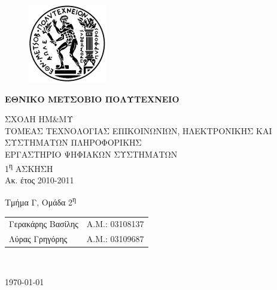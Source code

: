 \begin{titlepage}
\begin{center}
\begin{figure}[t] 
     \includegraphics[scale=0.7]{title/ntua_logo}
\end{figure}
\begin{LARGE}\textbf{ΕΘΝΙΚΟ ΜΕΤΣΟΒΙΟ ΠΟΛΥΤΕΧΝΕΙΟ\\}\end{LARGE}
\vspace{2cm}
\begin{Large}
ΣΧΟΛΗ ΗΜ\&ΜΥ\\
ΤΟΜΕΑΣ ΤΕΧΝΟΛΟΓΙΑΣ ΕΠΙΚΟΙΝΩΝΙΩΝ, ΗΛΕΚΤΡΟΝΙΚΗΣ ΚΑΙ ΣΥΣΤΗΜΑΤΩΝ ΠΛΗΡΟΦΟΡΙΚΗΣ\\
ΕΡΓΑΣΤΗΡΙΟ ΨΗΦΙΑΚΩΝ ΣΥΣΤΗΜΑΤΩΝ\\
1\textsuperscript{η} ΑΣΚΗΣΗ\\
Ακ. έτος 2010-2011\\
\end{Large}
\vspace{5cm}
\Large Τμήμα Γ, Ομάδα 2\textsuperscript{η}\\
\vspace{1cm}
\begin{tabular}{l r}
\Large{Γερακάρης Βασίλης}&
\large{Α.Μ.: 03108137}\\
\Large{Λύρας Γρηγόρης}&
\large{Α.Μ.: 03109687}\\
\end{tabular}\\
\vspace{5cm}

\vfill
\large\today\\
\end{center}
\end{titlepage}

